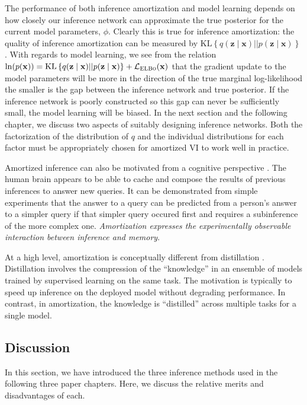 The performance of both inference amortization and model learning depends on how closely our inference network can approximate the true posterior for the current model parameters, $\phi$. Clearly this is true for inference amortization: the quality of inference amortization can be measured by $\text{KL}\left\{q(\mathbf{z}\mid\mathbf{x})||p(\mathbf{z}\mid\mathbf{x})\right\}$. With regards to model learning, we see from the relation $\ln(p(\mathbf{x}))=\text{KL}\left\{q(\mathbf{z}\mid\mathbf{x})||p(\mathbf{z}\mid\mathbf{x})\right\}+\mathcal{L}_{\text{\scshape ELBo}}(\mathbf{x})$ that the gradient update to the model parameters will be more in the direction of the true marginal log-likelihood the smaller is the gap between the inference network and true posterior. If the inference network is poorly constructed so this gap can never be sufficiently small, the model learning will be biased. In the next section and the following chapter, we discuss two aspects of suitably designing inference networks. Both the factorization of the distribution of $q$ and the individual distributions for each factor must be appropriately chosen for amortized VI to work well in practice.

Amortized inference can also be motivated from a cognitive perspective \citep{Gershman2014}. The human brain appears to be able to cache and compose the results of previous inferences to answer new queries. It can be demonstrated from simple experiments that the answer to a query can be predicted from a person's answer to a simpler query if that simpler query occured first and requires a subinference of the more complex one. \emph{Amortization expresses the experimentally observable interaction between inference and memory}.

At a high level, amortization is conceptually different from distillation \citep{hinton2015distilling}. Distillation involves the compression of the ``knowledge'' in an ensemble of models trained by supervised learning on the same task. The motivation is typically to speed up inference on the deployed model without degrading performance. In contrast, in amortization, the knowledge is ``distilled'' across multiple tasks for a single model.

\subsection{Discussion}
In this section, we have introduced the three inference methods used in the following three paper chapters. Here, we discuss the relative merits and disadvantages of each.

